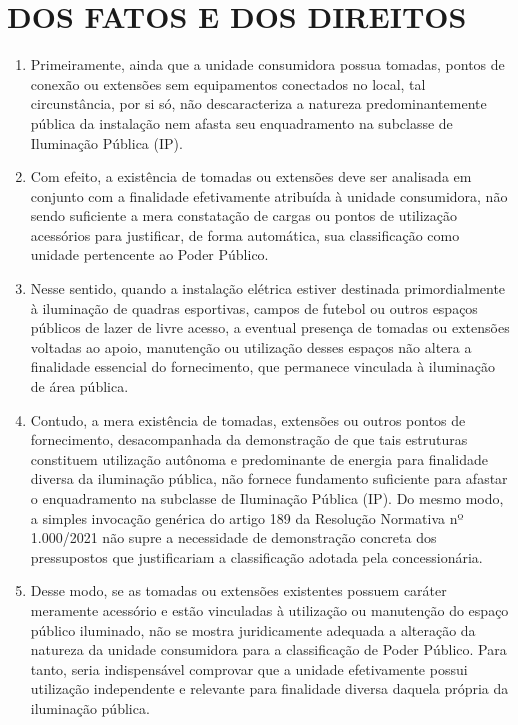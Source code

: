 \newcommand{\tipoRequerimento}{Cobrança indevida sobre enquadramento tarifário incorreto}
\section{DOS FATOS E DOS DIREITOS}


\begin{enumerate}[resume]

\item Primeiramente, ainda que a unidade consumidora possua tomadas, pontos de conexão ou extensões sem equipamentos conectados no local, tal circunstância, por si só, não descaracteriza a natureza predominantemente pública da instalação nem afasta seu enquadramento na subclasse de Iluminação Pública (IP).

\item Com efeito, a existência de tomadas ou extensões deve ser analisada em conjunto com a finalidade efetivamente atribuída à unidade consumidora, não sendo suficiente a mera constatação de cargas ou pontos de utilização acessórios para justificar, de forma automática, sua classificação como unidade pertencente ao Poder Público.

\item Nesse sentido, quando a instalação elétrica estiver destinada primordialmente à iluminação de quadras esportivas, campos de futebol ou outros espaços públicos de lazer de livre acesso, a eventual presença de tomadas ou extensões voltadas ao apoio, manutenção ou utilização desses espaços não altera a finalidade essencial do fornecimento, que permanece vinculada à iluminação de área pública.

\item Contudo, a mera existência de tomadas, extensões ou outros pontos de fornecimento, desacompanhada da demonstração de que tais estruturas constituem utilização autônoma e predominante de energia para finalidade diversa da iluminação pública, não fornece fundamento suficiente para afastar o enquadramento na subclasse de Iluminação Pública (IP). Do mesmo modo, a simples invocação genérica do artigo 189 da Resolução Normativa nº 1.000/2021 não supre a necessidade de demonstração concreta dos pressupostos que justificariam a classificação adotada pela concessionária.

\item Desse modo, se as tomadas ou extensões existentes possuem caráter meramente acessório e estão vinculadas à utilização ou manutenção do espaço público iluminado, não se mostra juridicamente adequada a alteração da natureza da unidade consumidora para a classificação de Poder Público. Para tanto, seria indispensável comprovar que a unidade efetivamente possui utilização independente e relevante para finalidade diversa daquela própria da iluminação pública.


\end{enumerate}
